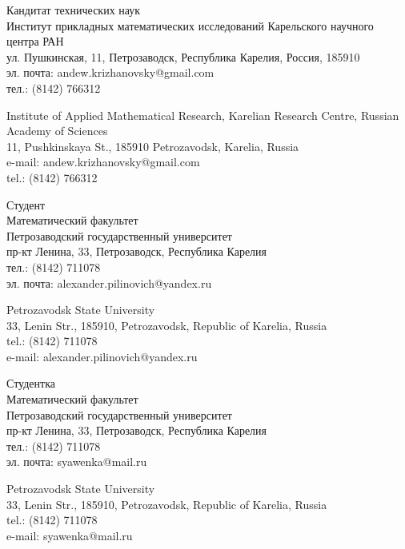 \documentclass{article}
\begin{document}
\begin{aboutauthors}
Кандитат технических наук\\ 
Институт прикладных математических исследований Карельского научного центра РАН\\ 
ул. Пушкинская, 11, Петрозаводск, Республика Карелия, Россия, 185910\\
эл. почта: andew.krizhanovsky@gmail.com\\
тел.: (8142) 766312

\columnbreak

Institute of Applied Mathematical Research, Karelian Research Centre, Russian Academy of Sciences\\
11, Pushkinskaya St., 185910 Petrozavodsk, Karelia, Russia\\
e-mail: andew.krizhanovsky@gmail.com\\
tel.: (8142) 766312
\end{aboutauthors}

\begin{aboutauthors}
Студент\\
Математический факультет\\ 
Петрозаводский государственный университет\\
пр-кт Ленина, 33, Петрозаводск, Республика Карелия\\
тел.: (8142) 711078\\
эл. почта: alexander.pilinovich@yandex.ru

\columnbreak

Petrozavodsk State University\\
33, Lenin Str., 185910, Petrozavodsk, Republic of Karelia, Russia\\
tel.: (8142) 711078\\
e-mail: alexander.pilinovich@yandex.ru 
\end{aboutauthors}

\begin{aboutauthors}
Студентка\\
Математический факультет\\ 
Петрозаводский государственный университет\\
пр-кт Ленина, 33, Петрозаводск, Республика Карелия\\
тел.: (8142) 711078\\
эл. почта: syawenka@mail.ru

\columnbreak

Petrozavodsk State University\\
33, Lenin Str., 185910, Petrozavodsk, Republic of Karelia, Russia\\
tel.: (8142) 711078\\
e-mail: syawenka@mail.ru 
\end{aboutauthors}
\end{document}
